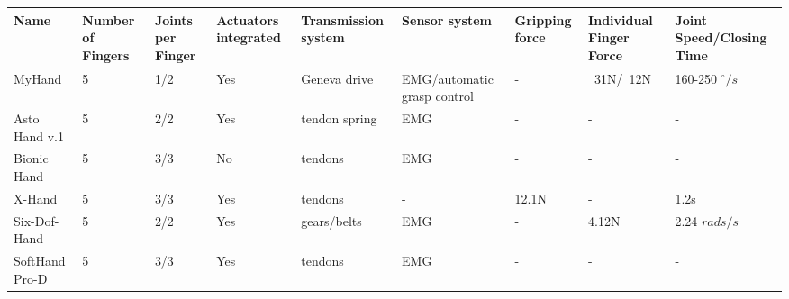 \documentclass[a4paper, 10pt, conference]{ieeeconf}      %
\begin{document}
\begin{tabular}{l|p{1.2cm}|p{1cm}|p{1.5cm}|p{2cm}|p{2cm}|p{1.2cm}|p{1.5cm}|p{2cm}}

Name & Number of Fingers & Joints per Finger & Actuators integrated & Transmission system & Sensor system & Gripping force & Individual Finger Force & Joint Speed/Closing Time\\
\hline
MyHand & 5 & 1/2 & Yes & Geneva drive & EMG/automatic grasp control & - & ~31N/~12N & 160-250 $^\circ/s$\\
\hline
Asto Hand v.1 & 5 & 2/2 & Yes & tendon spring & EMG & - & - & -\\
\hline
Bionic Hand & 5 & 3/3 & No & tendons & EMG & - & - & -\\
\hline
X-Hand & 5 & 3/3 & Yes & tendons & - & 12.1N & - & 1.2s\\
\hline
Six-Dof-Hand & 5 & 2/2 & Yes & gears/belts & EMG & - & 4.12N & 2.24 $rads/s$\\
\hline
SoftHand Pro-D & 5 & 3/3 & Yes & tendons & EMG & - & - & -\\


\end{tabular}


\nocite{*}

%
\end{document}
